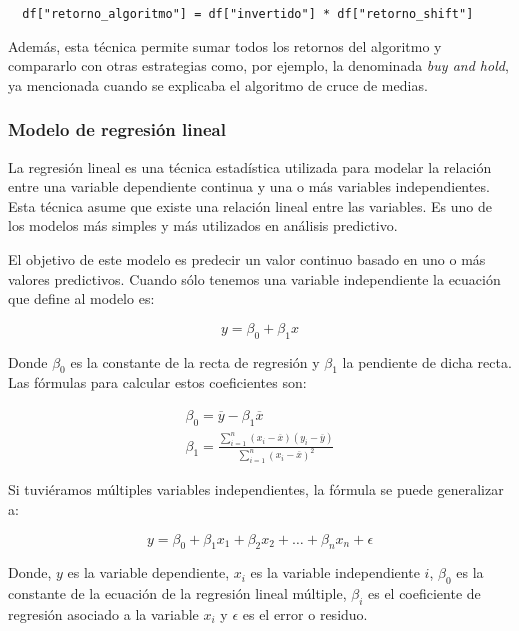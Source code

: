\begin{verbatim}
  df["retorno_algoritmo"] = df["invertido"] * df["retorno_shift"]
\end{verbatim}

Además, esta técnica permite sumar todos los retornos del algoritmo y compararlo con otras estrategias como, por ejemplo, la denominada \emph{buy and hold}, ya mencionada cuando se explicaba el algoritmo de cruce de medias. 


\subsubsection{Modelo de regresión lineal}

La regresión lineal es una técnica estadística utilizada para modelar la relación entre una variable dependiente continua y una o más variables independientes. Esta técnica asume que existe una relación lineal entre las variables. Es uno de los modelos más simples y más utilizados en análisis predictivo. 

El objetivo de este modelo es predecir un valor continuo basado en uno o más valores predictivos. Cuando sólo tenemos una variable independiente la ecuación que define al modelo es:

\begin{equation}
    y = \beta_{0} + \beta_{1}x
\end{equation}

Donde $\beta_{0}$ es la constante de la recta de regresión y $\beta_{1}$ la pendiente de dicha recta. Las fórmulas para calcular estos coeficientes son:

\begin{align}
	\beta_{0} = \overline{y} - \beta_{1}\overline{x} \\
	\beta_{1} = \frac{\sum_{i=1}^{n} (x_{i} - \overline{x})(y_{i}-\overline{y})}{\sum_{i=1}^{n} (x_{i} - \overline{x})^2}
\end{align}

Si tuviéramos múltiples variables independientes, la fórmula se puede generalizar a:

\begin{equation}
    y = \beta_{0} + \beta_{1}x_{1} + \beta_{2}x_{2} + \ldots + \beta_{n}x_{n} + \epsilon
\end{equation}

Donde, $y$ es la variable dependiente, $x_{i}$ es la variable independiente $i$, $\beta_{0}$ es la constante de la ecuación de la regresión lineal múltiple, $\beta_{i}$ es el coeficiente de regresión asociado a la variable $x_{i}$ y $\epsilon$ es el error o residuo. 

